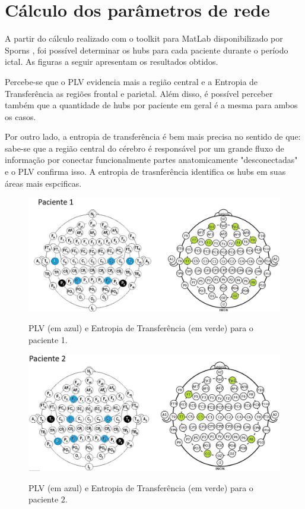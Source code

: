 \documentclass[
	12pt,				%
	openright,			%
	twoside,			%
	a4paper,			%
	english,			%
	french,				%
	spanish,			%
	brazil				%
	]{abntex2}
\begin{document}
\section{Cálculo dos parâmetros de rede}

A partir do cálculo realizado com o toolkit para MatLab disponibilizado por Sporns \cite{rubinov2010complex}, foi possível determinar os hubs para cada paciente durante o período ictal. As figuras a seguir apresentam os resultados obtidos.

Percebe-se que o PLV evidencia mais a região central e a Entropia de Transferência as regiões frontal e parietal. Além disso, é possível perceber também que a quantidade de hubs por paciente em geral é a mesma para ambos os casos.

Por outro lado, a entropia de transferência é bem mais precisa no sentido de que: sabe-se que a região central do cérebro é responsável por um grande fluxo de informação por conectar funcionalmente partes anatomicamente "desconectadas" e o PLV confirma isso. A entropia de trasnferência identifica os hubs em suas áreas mais espcificas.

\begin{figure}[h]
\centering
\includegraphics[width=17cm]{figs/p1.JPG}
\label{eeg}
\caption{PLV (em azul) e Entropia de Transferência (em verde) para o paciente 1.}
\end{figure}

\begin{figure}[]
\centering
\includegraphics[width=17cm]{figs/p2.JPG}
\label{eeg}
\caption{PLV (em azul) e Entropia de Transferência (em verde) para o paciente 2.}
\end{figure}
\end{document}
